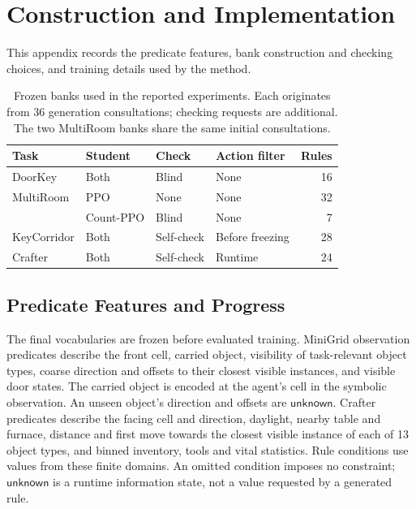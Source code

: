 \section{Construction and Implementation}
\label{app:construction}

This appendix records the predicate features, bank construction and
checking choices, and training details used by the method.

\begin{table}[t]
\centering\small
\caption{Frozen banks used in the reported experiments. Each originates
from 36 generation consultations; checking requests are additional.
The two MultiRoom banks share the same initial consultations.}
\label{tab:banks}
\begin{tabular}{@{}llllr@{}}
\toprule
Task & Student & Check & Action filter & Rules\\
\midrule
DoorKey & Both & Blind & None & 16\\
MultiRoom & PPO & None & None & 32\\
 & Count-PPO & Blind & None & 7\\
KeyCorridor & Both & Self-check & Before freezing & 28\\
Crafter & Both & Self-check & Runtime & 24\\
\bottomrule
\end{tabular}
\end{table}

\subsection{Predicate Features and Progress}
\label{app:predicate_features}

The final vocabularies are frozen before evaluated training. MiniGrid observation predicates describe the front
cell, carried object, visibility of task-relevant object types, coarse
direction and offsets to their closest visible instances, and visible
door states. The carried object is encoded at the agent's cell in the
symbolic observation. An unseen object's direction and offsets are
$\mathsf{unknown}$.
Crafter predicates describe the facing cell and direction, daylight,
nearby table and furnace, distance and first move towards the closest
visible instance of each of 13 object types, and binned inventory,
tools and vital statistics.
Rule conditions use values from these finite domains. An omitted
condition imposes no constraint; $\mathsf{unknown}$ is a runtime
information state, not a value requested by a generated rule.

